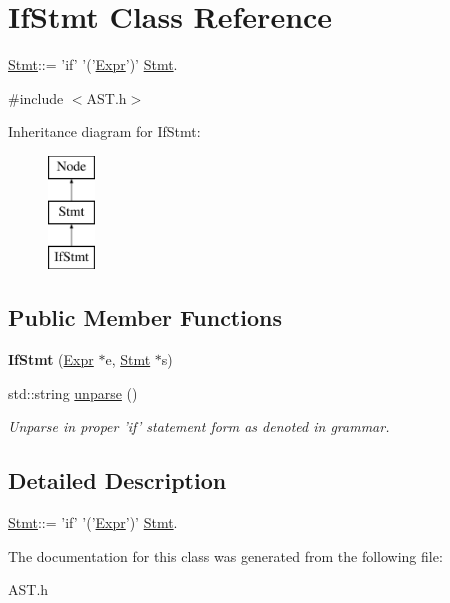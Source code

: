 \hypertarget{classIfStmt}{\section{If\-Stmt Class Reference}
\label{classIfStmt}
}


\hyperlink{classStmt}{Stmt}\-:\-:= 'if' '('\hyperlink{classExpr}{Expr}')' \hyperlink{classStmt}{Stmt}.  




{\ttfamily \#include $<$A\-S\-T.\-h$>$}

Inheritance diagram for If\-Stmt\-:\begin{figure}[H]
\begin{center}
\leavevmode
\includegraphics[height=3.000000cm]{classIfStmt}
\end{center}
\end{figure}
\subsection*{Public Member Functions}
\begin{DoxyCompactItemize}
\item 
\hypertarget{classIfStmt_a917206365fb4307ede6751d2d00e0a58}{{\bfseries If\-Stmt} (\hyperlink{classExpr}{Expr} $\ast$e, \hyperlink{classStmt}{Stmt} $\ast$s)}\label{classIfStmt_a917206365fb4307ede6751d2d00e0a58}

\item 
\hypertarget{classIfStmt_a615e8785edb068f24e19f3ce7863f2ce}{std\-::string \hyperlink{classIfStmt_a615e8785edb068f24e19f3ce7863f2ce}{unparse} ()}\label{classIfStmt_a615e8785edb068f24e19f3ce7863f2ce}

\begin{DoxyCompactList}\small\item\em Unparse in proper 'if' statement form as denoted in grammar. \end{DoxyCompactList}\end{DoxyCompactItemize}


\subsection{Detailed Description}
\hyperlink{classStmt}{Stmt}\-:\-:= 'if' '('\hyperlink{classExpr}{Expr}')' \hyperlink{classStmt}{Stmt}. 

The documentation for this class was generated from the following file\-:\begin{DoxyCompactItemize}
\item 
A\-S\-T.\-h\end{DoxyCompactItemize}
